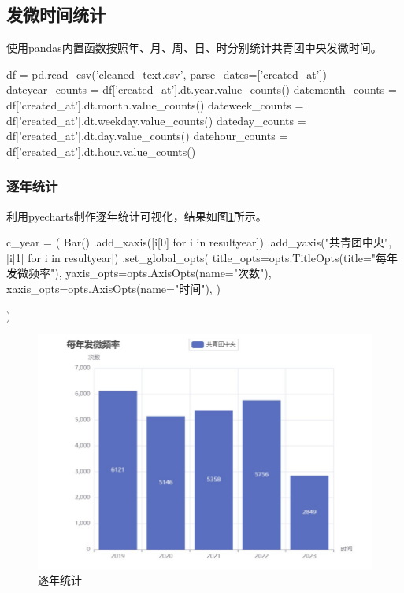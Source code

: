 \subsection{发微时间统计}
使用pandas内置函数按照年、月、周、日、时分别统计共青团中央发微时间。
\begin{python}
    df = pd.read_csv('cleaned_text.csv', parse_dates=['created_at'])
    dateyear_counts = df['created_at'].dt.year.value_counts()
    datemonth_counts = df['created_at'].dt.month.value_counts()
    dateweek_counts = df['created_at'].dt.weekday.value_counts()
    dateday_counts = df['created_at'].dt.day.value_counts()
    datehour_counts = df['created_at'].dt.hour.value_counts()
\end{python}

\subsubsection{逐年统计}
利用pyecharts制作逐年统计可视化，结果如图\ref{fig:yearfre}所示。
\begin{python}
    c_year = (
        Bar()
        .add_xaxis([i[0] for i in resultyear])
        .add_yaxis("共青团中央", [i[1] for i in resultyear])
        .set_global_opts(
            title_opts=opts.TitleOpts(title="每年发微频率"),
            yaxis_opts=opts.AxisOpts(name="次数"),
            xaxis_opts=opts.AxisOpts(name="时间"),
        )

    )
\end{python}
\begin{figure}[H]
    \centering
    \includegraphics[width=12cm]{figure/yearfre.jpg}
    \caption{逐年统计} \label{fig:yearfre}
\end{figure} 
